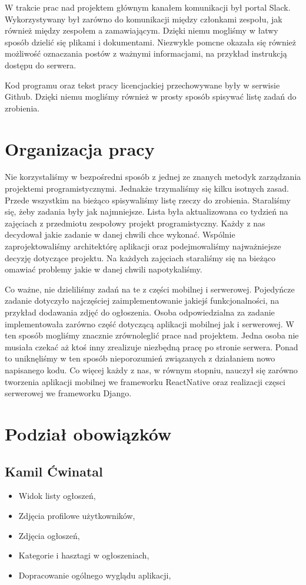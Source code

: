 \documentclass[licencjacka]{pracamgr}
\begin{document}
W trakcie prac nad projektem głównym kanałem komunikacji był portal Slack. Wykorzystywany był zarówno do komunikacji między członkami zespołu, jak również między zespołem a zamawiającym. Dzięki niemu mogliśmy w łatwy sposób dzielić się plikami i dokumentami. Niezwykle pomcne okazała się również możliwość oznaczania postów z ważnymi informacjami, na przykład instrukcją dostępu do serwera.

Kod programu oraz tekst pracy licencjackiej przechowywane były w serwisie Github. Dzięki niemu mogliśmy również w prosty sposób spisywać listę zadań do zrobienia.

\section{Organizacja pracy}

Nie korzystaliśmy w bezpośredni sposób z jednej ze znanych metodyk zarządzania projektemi programistycznymi. Jednakże trzymaliśmy się kilku isotnych zasad. Przede wszystkim na bieżąco spisywaliśmy listę rzeczy do zrobienia. Staraliśmy się, żeby zadania były jak najmniejsze. Lista była aktualizowana co tydzień na zajęciach z przedmiotu zespołowy projekt programistyczny. Każdy z nas decydował jakie zadanie w danej chwili chce wykonać. Wspólnie zaprojektowaliśmy architektórę aplikacji oraz podejmowaliśmy najważniejsze decyzję dotyczące projektu. Na każdych zajęciach staraliśmy się na bieżąco omawiać problemy jakie w danej chwili napotykaliśmy.

Co ważne, nie dzieliliśmy zadań na te z części mobilnej i serwerowej. Pojedyńcze zadanie dotyczyło najczęściej zaimplementowanie jakiejś funkcjonalności, na przykład dodawania zdjęć do ogłoszenia. Osoba odpowiedzialna za zadanie implementowała zarówno część dotyczącą aplikacji mobilnej jak i serwerowej. W ten sposób mogliśmy znacznie zrównoleglić prace nad projektem. Jedna osoba nie musiała czekać aż ktoś inny zrealizuje niezbędną pracę po stronie serwera. Ponad to uniknęliśmy w ten sposób nieporozumień związanych z działaniem nowo napisanego kodu. Co więcej każdy z nas, w równym stopniu, nauczył się zarówno tworzenia aplikacji mobilnej we frameworku ReactNative oraz realizacji częsci serwerowej we frameworku Django.

\section{Podział obowiązków}

\subsection{Kamil Ćwinatal}
\begin{itemize}
\setlength\itemsep{-0.2em}
    \item Widok listy ogłoszeń,
    \item Zdjęcia profilowe użytkowników,
    \item Zdjęcia ogłoszeń,
    \item Kategorie i hasztagi w ogłoszeniach,
    \item Dopracowanie ogólnego wyglądu aplikacji,
\end{itemize}{}
\end{document}
